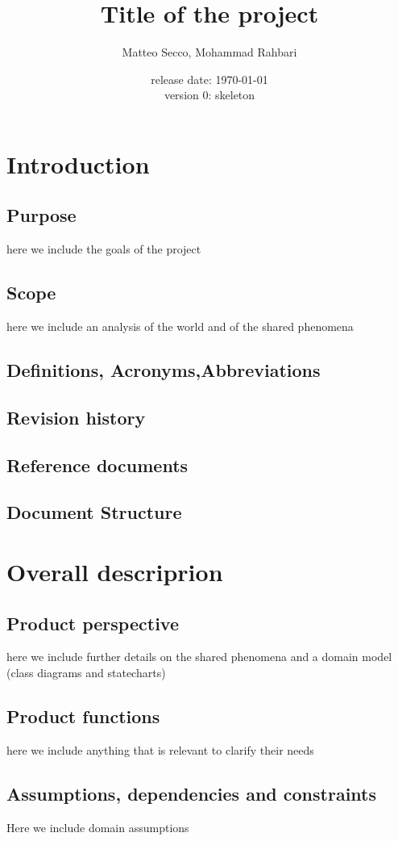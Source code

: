 \documentclass{article}
\title{Title of the project}
\date{release date: \today\\version 0: skeleton}
\author{Matteo Secco, Mohammad Rahbari}
\begin{document}
\maketitle
\newpage
\tableofcontents
\newpage
{}
\section{Introduction}
	\subsection{Purpose} here we	 include	 the	 goals of the project	
	\subsection{Scope} here we include an analysis of the world and of the shared phenomena
	\subsection{Definitions, Acronyms,Abbreviations}
	\subsection{Revision history}
	\subsection{Reference documents}
	\subsection{Document Structure}
\section{Overall descriprion}
	\subsection{Product perspective} here we include further details on the shared phenomena and a domain model (class diagrams and statecharts)
	\subsection{Product functions}here we include anything that is relevant to clarify their needs
	\subsection{Assumptions, dependencies and constraints} Here we include domain assumptions
\end{document}
